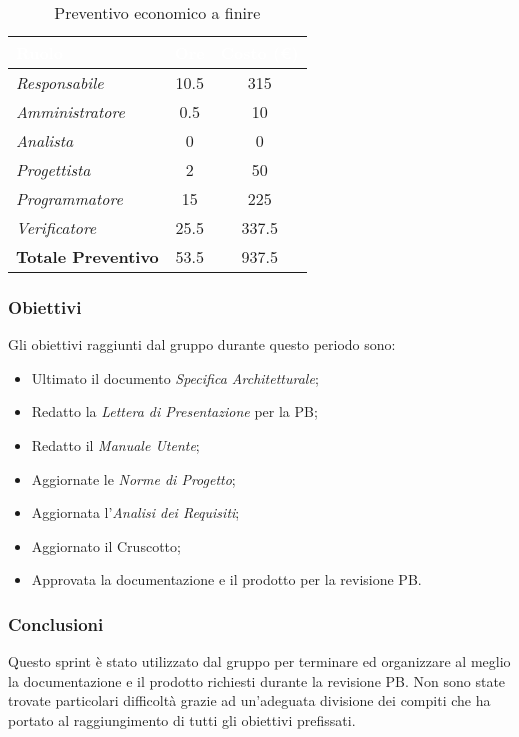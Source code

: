 \begin{table}[H]
    \renewcommand\arraystretch{1.5}
    \centering
    \begin{tabular}{|l|c|c|}
    \hline
    \rowcolor[HTML]{036400}
    \textcolor{white}{\textbf{Ruolo}} & \multicolumn{1}{l|}{\textcolor{white}{\textbf{Ore}}} & \multicolumn{1}{l|}{\textcolor{white}{\textbf{Costo (€)}}} \\ \hline
    \rowcolor[HTML]{EFEFEF}\textit{Responsabile}      & 10.5         & 315               \\ \hline
    \rowcolor[HTML]{C0C0C0}\textit{Amministratore}    & 0.5          & 10                \\ \hline
    \rowcolor[HTML]{EFEFEF}\textit{Analista}          & 0            & 0                 \\ \hline
    \rowcolor[HTML]{C0C0C0}\textit{Progettista}       & 2            & 50                \\ \hline
    \rowcolor[HTML]{EFEFEF}\textit{Programmatore}     & 15           & 225               \\ \hline
    \rowcolor[HTML]{C0C0C0}\textit{Verificatore}      & 25.5         & 337.5             \\ \hline
    \rowcolor[HTML]{EFEFEF}\textbf{Totale Preventivo} & 53.5         & 937.5            \\ \hline
    \end{tabular}
    \caption{Preventivo economico a finire}
\end{table}

\subsubsection{Obiettivi}
Gli obiettivi raggiunti dal gruppo durante questo periodo sono:
\begin{itemize}
    \item Ultimato il documento \textit{Specifica Architetturale};
    \item Redatto la \textit{Lettera di Presentazione} per la PB;
    \item Redatto il \textit{Manuale Utente};
    \item Aggiornate le \textit{Norme di Progetto};
    \item Aggiornata l'\textit{Analisi dei Requisiti};
    \item Aggiornato il Cruscotto;
    \item Approvata la documentazione e il prodotto per la revisione PB.
\end{itemize}

\subsubsection{Conclusioni}
Questo sprint è stato utilizzato dal gruppo per terminare ed organizzare al meglio la documentazione e il prodotto richiesti durante la revisione PB. Non sono state trovate particolari difficoltà grazie ad un'adeguata divisione dei compiti che ha portato al raggiungimento di tutti gli obiettivi prefissati.

